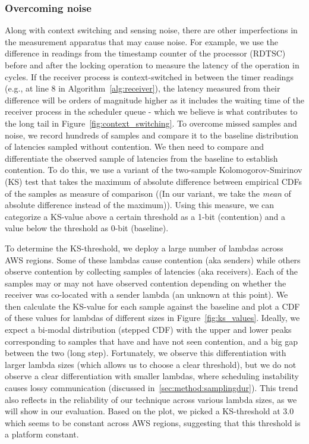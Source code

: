\subsubsection{Overcoming noise} 
\label{sec:method:noise}
Along with context switching and sensing noise, there are other imperfections in
the measurement apparatus that may cause noise. For example, we use the difference in
readings from the timestamp counter of the processor (RDTSC) before and after
the locking operation to measure the latency of the operation in cycles. If the
receiver process is context-switched in between the timer readings (e.g., at
line 8 in Algorithm~\ref{alg:receiver}), the latency measured from their
difference will be orders of magnitude higher as it includes the waiting time of
the receiver process in the scheduler queue - which we believe is what
contributes to the long tail in Figure~\ref{fig:context_switching}. To overcome
missed samples and noise, we record hundreds of samples and compare it to the
baseline distribution of latencies sampled without contention. We then need to
compare and differentiate the observed sample of latencies from the baseline to
establish contention. To do this, we use a variant of the two-sample 
Kolomogorov-Smirinov (KS) test that takes the maximum of absolute difference between 
empirical CDFs of the samples as measure of comparison ((In our variant, we take the 
\emph{mean} of absolute difference instead of the maximum)). Using this measure,
we can categorize a KS-value above a certain threshold as a 1-bit (contention) and a 
value below the threshold as 0-bit (baseline).

To determine the KS-threshold, we deploy a large number of lambdas across AWS
regions. Some of these lambdas cause contention (aka senders) while others
observe contention by collecting samples of latencies (aka receivers). Each of
the samples may or may not have observed contention depending on whether the
receiver was co-located with a sender lambda (an unknown at this point). We then
calculate the KS-value for each sample against the baseline and plot a CDF of
these values for lambdas of different sizes in Figure~\ref{fig:ks_values}.
Ideally, we expect a bi-modal distribution (stepped CDF) with the upper and
lower peaks corresponding to samples that have and have not seen contention, and
a big gap between the two (long step). Fortunately, we observe this
differentiation with larger lambda sizes (which allows us to choose a clear
threshold), but we do not observe a clear differentiation with smaller lambdas,
where scheduling instability causes lossy communication (discussed in~\ref{sec:method:samplingdur}).  
This trend also reflects in the reliability of our technique across various
lambda sizes, as we will show in our evaluation. Based on the plot, we picked a
KS-threshold at 3.0 which seems to be constant across AWS regions, suggesting
that this threshold is a platform constant.

